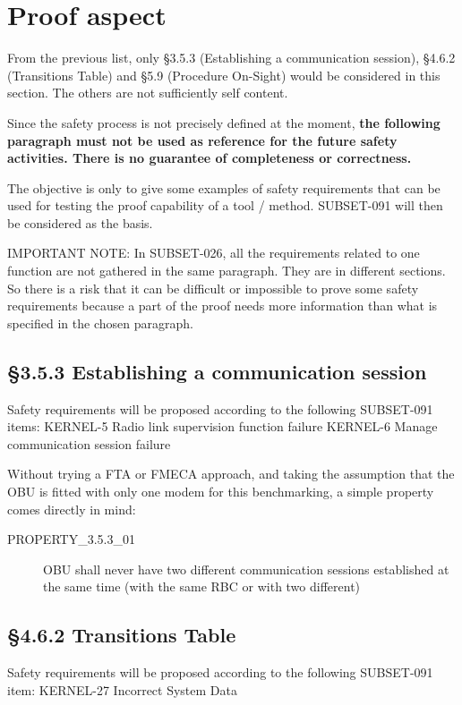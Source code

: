 \documentclass{template/openetcs_report}
\begin{document}
\section{Proof aspect}
From the previous list, only \S3.5.3 (Establishing a communication session), \S4.6.2 (Transitions Table) and \S5.9 (Procedure On-Sight) would be considered in this section. The others are not sufficiently self content.

Since the safety process is not precisely defined at the moment, \textbf{the following paragraph must not be used as reference for the future safety activities. There is no guarantee of completeness or correctness.}

The objective is only to give some examples of safety requirements that can be used for testing the proof capability of a tool / method. SUBSET-091 will then be considered as the basis.

IMPORTANT NOTE: In SUBSET-026, all the requirements related to one function are not gathered in the same paragraph. They are in different sections. So there is a risk that it can be difficult or impossible to prove some safety requirements because a part of the proof needs more information than what is specified in the chosen paragraph.

\subsection{\S3.5.3 Establishing a communication session}
Safety requirements will be proposed according to the following SUBSET-091 items:
\newline KERNEL-5 Radio link supervision function failure
\newline KERNEL-6 Manage communication session failure

Without trying a FTA or FMECA approach, and taking the assumption that the OBU is fitted with only one modem for this benchmarking, a simple property comes directly in mind: 
\begin{description}
\item [PROPERTY\_3.5.3\_01] OBU shall never have two different communication sessions established at the same time (with the same RBC or with two different)
\end{description}

\subsection{\S4.6.2 Transitions Table}
Safety requirements will be proposed according to the following SUBSET-091 item:
\newline KERNEL-27 Incorrect System Data
\end{document}
